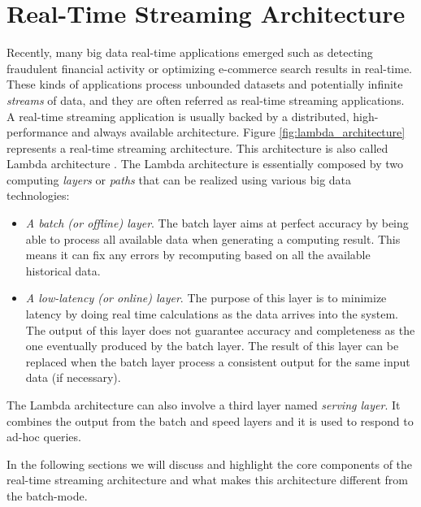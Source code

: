 \section{Real-Time Streaming Architecture}
Recently, many big data real-time applications emerged such as detecting fraudulent financial activity or optimizing e-commerce search results in real-time. These kinds of applications process unbounded datasets and potentially infinite \emph{streams} of data, and they are often  referred as real-time streaming applications. A real-time streaming application is usually backed by a distributed, high-performance and always available architecture. Figure \ref{fig:lambda_architecture} represents a real-time streaming architecture. This architecture is also called Lambda architecture \cite{fastdataarchitecture, lambdaarchitecturecosteffective, alljoynlambda}. %
The Lambda architecture is essentially composed by two computing \emph{layers} or \emph{paths} that can be realized using various big data technologies:
\begin{itemize}
\item \emph{A batch (or offline) layer}. The batch layer aims at perfect accuracy by being able to process all available data when generating a computing result. This means it can fix any errors by recomputing based on all the available historical data.

\item \emph{A low-latency (or online) layer}. The purpose of this layer is to minimize latency by doing real time calculations as the data arrives into the system. The output of this layer does not guarantee accuracy and completeness as the one eventually produced by the batch layer. The result of this layer can be replaced when the batch layer process a consistent output for the same input data (if necessary).
\end{itemize}

The Lambda architecture can also involve a third layer named \emph{serving layer}. It combines the output from the batch and speed layers and it is used to respond to ad-hoc queries.

In the following sections we will discuss and highlight the core components of the real-time streaming architecture and what makes this architecture different from the batch-mode.

